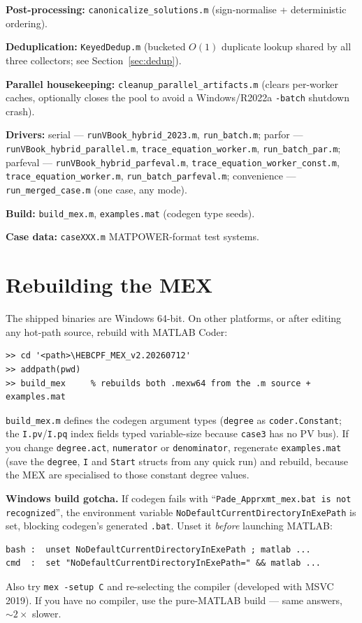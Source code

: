 \documentclass[11pt,a4paper]{article}
\newcommand{\code}[1]{\texttt{#1}}
\begin{document}
\textbf{Post-processing:} \code{canonicalize_solutions.m} (sign-normalise + deterministic
ordering).

\textbf{Deduplication:} \code{KeyedDedup.m} (bucketed $O(1)$ duplicate lookup shared by all
three collectors; see Section~\ref{sec:dedup}).

\textbf{Parallel housekeeping:} \code{cleanup_parallel_artifacts.m} (clears per-worker
caches, optionally closes the pool to avoid a Windows/R2022a \code{-batch} shutdown
crash).

\textbf{Drivers:}
serial --- \code{runVBook_hybrid_2023.m}, \code{run_batch.m};
parfor --- \code{runVBook_hybrid_parallel.m}, \code{trace_equation_worker.m},
\code{run_batch_par.m};
parfeval --- \code{runVBook_hybrid_parfeval.m}, \code{trace_equation_worker_const.m},
\code{trace_equation_worker.m}, \code{run_batch_parfeval.m};
convenience --- \code{run_merged_case.m} (one case, any mode).

\textbf{Build:} \code{build_mex.m}, \code{examples.mat} (codegen type seeds).

\textbf{Case data:} \code{caseXXX.m} MATPOWER-format test systems.

\section{Rebuilding the MEX}\label{sec:mex}

The shipped binaries are Windows 64-bit. On other platforms, or after editing any
hot-path source, rebuild with MATLAB Coder:
\begin{lstlisting}[style=mat]
>> cd '<path>\HEBCPF_MEX_v2.20260712'
>> addpath(pwd)
>> build_mex     % rebuilds both .mexw64 from the .m source + examples.mat
\end{lstlisting}
\code{build_mex.m} defines the codegen argument types (\code{degree} as
\code{coder.Constant}; the \code{I.pv}/\code{I.pq} index fields typed variable-size
because \code{case3} has no PV bus). If you change \code{degree.act}, \code{numerator} or
\code{denominator}, regenerate \code{examples.mat} (save the \code{degree}, \code{I} and
\code{Start} structs from any quick run) and rebuild, because the MEX are specialised to
those constant degree values.

\textbf{Windows build gotcha.} If codegen fails with
``\code{Pade_Apprxmt_mex.bat is not recognized}'', the environment variable
\code{NoDefaultCurrentDirectoryInExePath} is set, blocking codegen's generated \code{.bat}.
Unset it \emph{before} launching MATLAB:
\begin{lstlisting}[style=sh]
bash :  unset NoDefaultCurrentDirectoryInExePath ; matlab ...
cmd  :  set "NoDefaultCurrentDirectoryInExePath=" && matlab ...
\end{lstlisting}
Also try \code{mex -setup C} and re-selecting the compiler (developed with MSVC 2019). If
you have no compiler, use the pure-MATLAB build --- same answers, $\sim 2\times$ slower.
\end{document}
